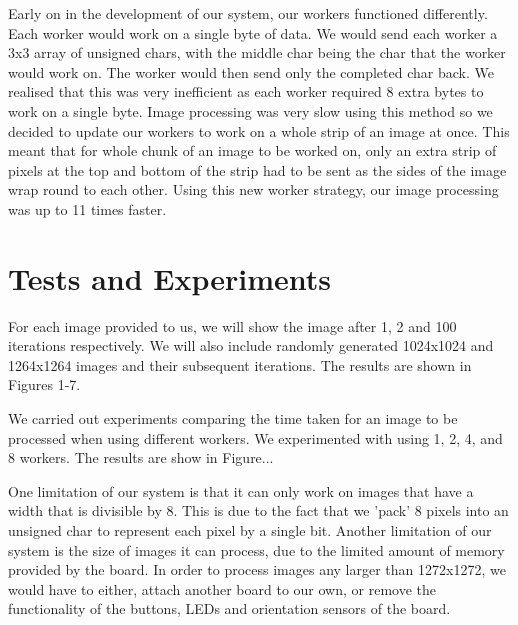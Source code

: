 \documentclass{article}
\begin{document}
\begin{multicols}{2}
Early on in the development of our system, our workers functioned differently. Each worker would work
on a single byte of data. We would send each worker a 3x3 array of unsigned chars, with the middle
char being the char that the worker would work on. The worker would then send only the completed
char back. We realised that this was very inefficient as each worker required 8 extra bytes to work
on a single byte. Image processing was very slow using this method so we decided to update
our workers to work on a whole strip of an image at once. This meant that for whole chunk of an image
to be worked on, only an extra strip of pixels at the top and bottom of the strip had to be sent as
the sides of the image wrap round to each other. Using this new worker strategy, our image processing
was up to 11 times faster.

\section{Tests and Experiments}
For each image provided to us, we will show the image after 1, 2 and 100
iterations respectively. We will also include randomly generated 1024x1024 and 1264x1264 images and their
subsequent iterations. The results are shown in Figures 1-7.

\vspace{5mm}

We carried out experiments comparing the time taken for an image to be processed when using different
workers. We experimented with using 1, 2, 4, and 8 workers. The results are show in Figure...

\vspace{5mm}

One limitation of our system is that it can only work on images that have a width that is divisible by
8. This is due to the fact that we 'pack' 8 pixels into an unsigned char to represent each pixel by
a single bit. Another limitation of our system is the size of images it can process, due to the limited
amount of memory provided by the board. In order to process images any larger than 1272x1272, we would
have to either, attach another board to our own, or remove the functionality of the buttons, LEDs and
orientation sensors of the board.

\end{multicols}

\newpage

\end{document}
